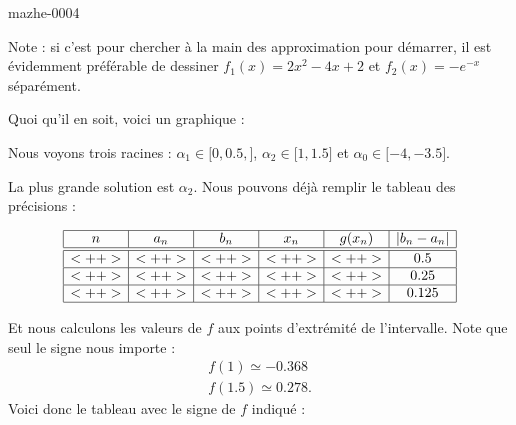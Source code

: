 
\begin{corrige}{mazhe-0004}

    Note : si c'est pour chercher à la main des approximation pour démarrer, il est évidemment préférable de dessiner \( f_1(x)=2x^2-4x+2\) et \( f_2(x)=- e^{-x}\) séparément.

    Quoi qu'il en soit, voici un graphique :

\begin{center}
   
\end{center}

    Nous voyons trois racines : \( \alpha_1\in\mathopen[ 0,0.5 ,  \mathclose]\), \( \alpha_2\in\mathopen[ 1, 1.5 \mathclose]\) et \( \alpha_0\in\mathopen[ -4 , -3.5 \mathclose]\).

    La plus grande solution est \( \alpha_2\). Nous pouvons déjà remplir le tableau des précisions :

    \begin{equation*}
        \begin{array}[]{|c|c|c|c|c|c|}
            \hline
            n&a_n&b_n&x_n&g(x_n)&| b_n-a_n |\\
            \hline\hline
            <++>&<++>&<++>&<++>&<++>&0.5\\
            \hline
            <++>&<++>&<++>&<++>&<++>&0.25\\
            \hline
            <++>&<++>&<++>&<++>&<++>&0.125\\
            \hline
        \end{array}
    \end{equation*}

    Et nous calculons les valeurs de \( f\) aux points d'extrémité de l'intervalle. Note que seul le signe nous importe :
    \begin{subequations}
        \begin{align}
            f(1)\simeq -0.368\\
            f(1.5)\simeq 0.278.
        \end{align}
    \end{subequations}
    Voici donc le tableau avec le signe de \( f\) indiqué :


\end{corrige}
